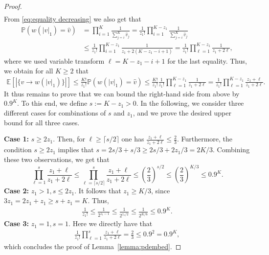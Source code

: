 \documentclass[10pt,a4paper]{amsart}
\newcommand{\E}{\mathbb{E}} %
\newcommand{\p}{\mathbb{P}} %
\begin{document}
\begin{proof}
\begin{align}
\end{align}
From \eqref{eq:equality decreasing} we also get that
\begin{align*}
    \p\left(w\left(|v|_1\right) =  \hat{v}  \right) 
    &= 
    \prod_{i=1}^{K} \frac{1}{\sum_{j=i}^{K}  \hat{v}_j} 
    = 
    \frac{1}{z_1!} \prod_{i=1}^{K-z_1} \frac{1}{\sum_{j=i}^{K}  \hat{v}_j}\\
    &
    \leq
    \frac{1}{z_1!} \prod_{i=1}^{K-z_1} \frac{1}{z_1 + 2(K-z_1 - i+ 1)}
    =
    \frac{1}{z_1!} \prod_{\ell=1}^{K-z_1} \frac{1}{z_1 + 2\ell},
\end{align*}
where we used variable transform $\ell=K-z_1-i+1$ for the last equality. Thus, we obtain for all $K\geq 2$ that 
\begin{align}\label{eq:outdegree bound}
	\E \left[| \{ v \rightarrow w \left(|v|_1\right) \}|\right]\leq \frac{K!}{z_1! } \p\left(w\left(|v|_1\right) =  \hat{v} \right)
    \leq \frac{K!}{z_1!} \frac{1}{z_1!} \prod_{\ell=1}^{K-z_1} \frac{1}{z_1 + 2\ell}
	= 
	\frac{1}{z_1!} \prod_{\ell=1}^{K- z_1} \frac{z_1+\ell}{z_1+2\ell}.
\end{align}
It thus remains to prove that we can bound the right-hand side from above by $0.9^K$. To this end, we define $s:=K-z_1>0$. In the following, we consider three different cases for combinations of $s$ and $z_1$, and we prove the desired upper bound for all three cases.

    \noindent
    \textbf{Case 1:}  $s\geq 2z_1$. Then, for $\ell \geq \lceil s/2 \rceil$ one has $\frac{z_1+\ell}{z_1+2\ell} \leq \frac{2}{3}$. Furthermore, the condition $s\geq 2z_1$ implies that
    $s = 2s/3 + s/3 \geq 2s/3 + 2z_{1}/3 = 2K/3$. 
    Combining these two observations, we get that
    \begin{equation*}
        \prod_{\ell=1}^{s}\frac{z_1+\ell}{z_1+2\ell} \leq \prod_{\ell=\lceil s/2 \rceil}^{s}\frac{z_1+\ell}{z_1+2\ell} \leq \left(\frac{2}{3}\right)^{s/2} \leq \left(\frac{2}{3}\right)^{K/3} \leq 0.9^K.
    \end{equation*}
    \textbf{Case 2:}   $z_1> 1, s\leq 2z_1$. 
    It follows that $z_1 \geq K/3$, since 
    $3 z_{1} = 2 z_{1} + z_{1} \geq s + z_{1} = K$. 
    Thus, 
    \begin{align*}
        \frac{1}{z_1!}\leq \frac{1}{2^{z_1-1}} \leq \frac{1}{2^{z_1/2}} \leq \frac{1}{2^{K/6}} \leq 0.9^K.
    \end{align*}
\textbf{Case 3:} $z_1=1, s=1$. Here we directly have that
\begin{align*}
    \frac{1}{z_1!} \prod_{\ell=1}^{s} \frac{z_1+\ell}{z_1+2\ell} = \frac{2}{3} \leq 0.9^2 = 0.9^K,
\end{align*}
which concludes the proof of Lemma~\ref{lemma:pdembed}.
\end{proof}
\end{document}
